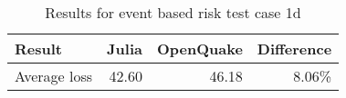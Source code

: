 \begin{table}[htbp]

\centering
\begin{tabular}{ l r r r }

\hline
\rowcolor{anti-flashwhite}
\bf{Result} & \bf{Julia} & \bf{OpenQuake} & \bf{Difference}\\
\hline
Average loss & 42.60 & 46.18 & 8.06\% \\
\hline
\end{tabular}

\caption{Results for event based risk test case 1d}
\label{tab:result-ebr-1d}
\end{table}